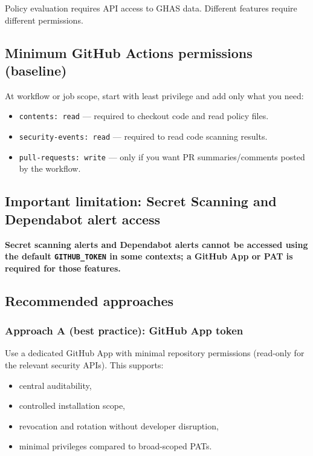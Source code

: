 \documentclass[11pt]{article}
\renewcommand{\cmd}[1]{\texttt{#1}}
\begin{document}
Policy evaluation requires API access to GHAS data. Different features require different permissions.

\subsection{Minimum GitHub Actions permissions (baseline)}

At workflow or job scope, start with least privilege and add only what you need:
\begin{itemize}[leftmargin=*]
  \item \cmd{contents: read} --- required to checkout code and read policy files.
  \item \cmd{security-events: read} --- required to read code scanning results.
  \item \cmd{pull-requests: write} --- only if you want PR summaries/comments posted by the workflow.
\end{itemize}

\subsection{Important limitation: Secret Scanning and Dependabot alert access}

\textbf{Secret scanning alerts and Dependabot alerts cannot be accessed using the default \cmd{GITHUB\_TOKEN} in some contexts; a GitHub App or PAT is required for those features.}

\subsection{Recommended approaches}

\subsubsection{Approach A (best practice): GitHub App token}

Use a dedicated GitHub App with minimal repository permissions (read-only for the relevant security APIs). This supports:
\begin{itemize}[leftmargin=*]
  \item central auditability,
  \item controlled installation scope,
  \item revocation and rotation without developer disruption,
  \item minimal privileges compared to broad-scoped PATs.
\end{itemize}
\end{document}
